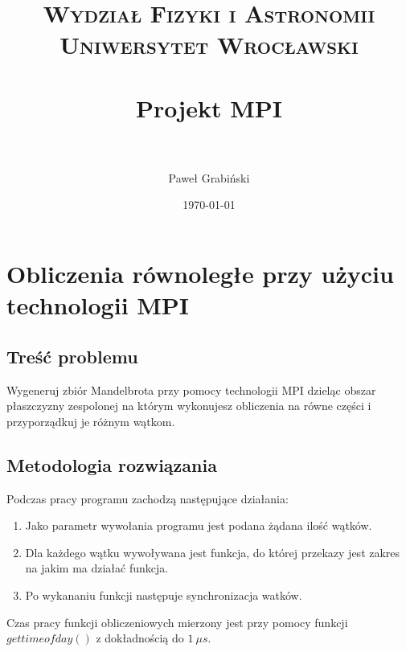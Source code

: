 \documentclass[paper=a4, fontsize=13pt]{scrartcl} %
\title{	
\normalfont \normalsize 
\textsc{Wydział Fizyki i Astronomii\\Uniwersytet Wrocławski} \\ [25pt] %
\horrule{0.5pt} \\[0.4cm] %
\huge Projekt MPI \\ %
\horrule{2pt} \\[0.5cm] %
}
\author{Paweł Grabiński} %
\date{\normalsize\today} %
\numberwithin{equation}{section} %
\numberwithin{figure}{section} %
\numberwithin{table}{section} %
\begin{document}
\maketitle %

\section{Obliczenia równoległe przy użyciu technologii MPI}
\subsection{Treść problemu}
Wygeneruj zbiór Mandelbrota przy pomocy technologii MPI dzieląc obszar płaszczyzny zespolonej na którym wykonujesz obliczenia na równe części i przyporządkuj je różnym wątkom.

\subsection{Metodologia rozwiązania}
Podczas pracy programu zachodzą następujące działania:
\begin{enumerate}
	\item Jako parametr wywołania programu jest podana żądana ilość wątków.
	\item Dla każdego wątku wywoływana jest funkcja, do której przekazy jest zakres na jakim ma działać funkcja.
	\item Po wykananiu funkcji następuje synchronizacja watków.
\end{enumerate}
Czas pracy funkcji obliczeniowych mierzony jest przy pomocy funkcji $gettimeofday()$ z dokładnością do $1\:\mu s$.
\end{document}
